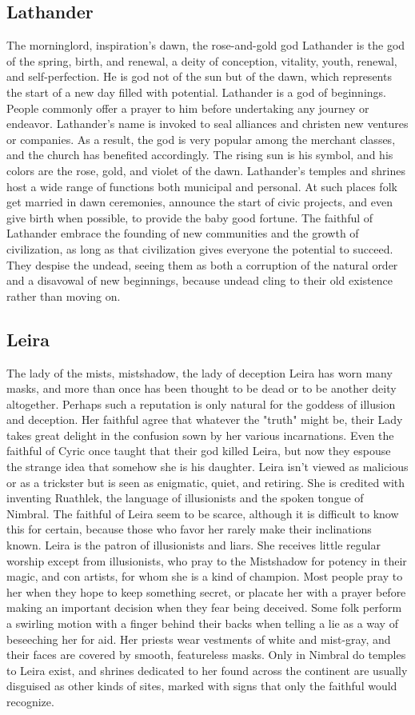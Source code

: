 \documentclass[10pt,a4paper,twoside,twocolumn,openany,bg=print,nodeprecatedcode]{dndbook}
\begin{document}
\subsection{Lathander}
The morninglord, inspiration's dawn, the rose-and-gold god
Lathander is the god of the spring, birth, and renewal, a deity of conception, vitality, youth, renewal, and self-perfection. He is god not of the sun but of the dawn, which represents the start of a new day filled with potential.
Lathander is a god of beginnings. People commonly offer a prayer to him before undertaking any journey or endeavor. Lathander's name is invoked to seal alliances and christen new ventures or companies. As a result, the god is very popular among the merchant classes, and the church has benefited accordingly.
The rising sun is his symbol, and his colors are the rose, gold, and violet of the dawn. Lathander's temples and shrines host a wide range of functions both municipal and personal. At such places folk get married in dawn ceremonies, announce the start of civic projects, and even give birth when possible, to provide the baby good fortune.
The faithful of Lathander embrace the founding of new communities and the growth of civilization, as long as that civilization gives everyone the potential to succeed. They despise the undead, seeing them as both a corruption of the natural order and a disavowal of new beginnings, because undead cling to their old existence rather than moving on.
\subsection{Leira}
The lady of the mists, mistshadow, the lady of deception
Leira has worn many masks, and more than once has been thought to be dead or to be another deity altogether. Perhaps such a reputation is only natural for the goddess of illusion and deception. Her faithful agree that whatever the "truth" might be, their Lady takes great delight in the confusion sown by her various incarnations. Even the faithful of Cyric once taught that their god killed Leira, but now they espouse the strange idea that somehow she is his daughter.
Leira isn't viewed as malicious or as a trickster but is seen as enigmatic, quiet, and retiring. She is credited with inventing Ruathlek, the language of illusionists and the spoken tongue of Nimbral.
The faithful of Leira seem to be scarce, although it is difficult to know this for certain, because those who favor her rarely make their inclinations known. Leira is the patron of illusionists and liars. She receives little regular worship except from illusionists, who pray to the Mistshadow for potency in their magic, and con artists, for whom she is a kind of champion. Most people pray to her when they hope to keep something secret, or placate her with a prayer before making an important decision when they fear being deceived. Some folk perform a swirling motion with a finger behind their backs when telling a lie as a way of beseeching her for aid.
Her priests wear vestments of white and mist-gray, and their faces are covered by smooth, featureless masks. Only in Nimbral do temples to Leira exist, and shrines dedicated to her found across the continent are usually disguised as other kinds of sites, marked with signs that only the faithful would recognize.
\end{document}
